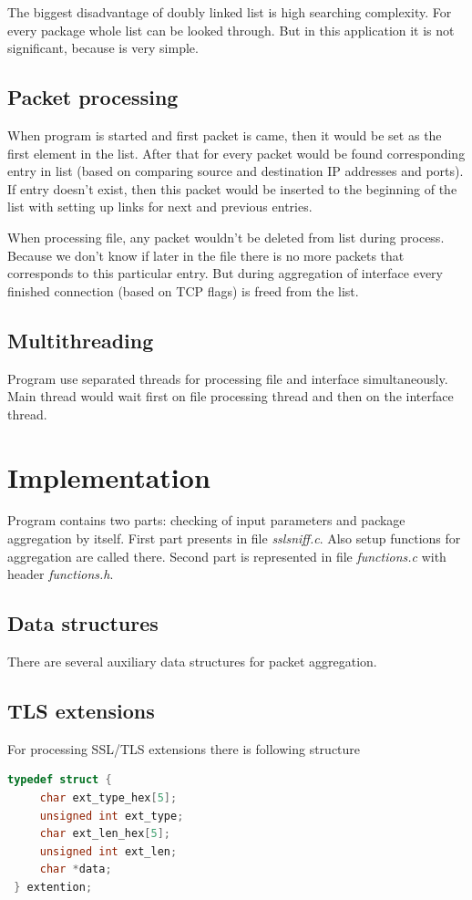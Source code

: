 \documentclass[12pt,a4paper]{article}
\begin{document}
    The biggest disadvantage of doubly linked list is high searching complexity.
    For every package whole list can be looked through. But in this application 
    it is not significant, because is very simple. 

    \subsection{Packet processing}

    When program is started and first packet is came, then it would be set as 
    the first element in the list. After that for every packet would be found 
    corresponding entry in list (based on comparing source and destination 
    IP addresses and ports). If entry doesn't exist, then this packet would be
    inserted to the beginning of the list with setting up links for next 
    and previous entries.
    
    When processing file, any packet wouldn't be deleted from list during 
    process. Because we don't know if later in the file there is no more 
    packets that corresponds to this particular entry. But during aggregation 
    of interface every finished connection (based on TCP flags) is freed from 
    the list.


    \subsection{Multithreading}
    Program use separated threads for processing file and interface 
    simultaneously. Main thread would wait first on file processing thread 
    and then on the interface thread.

    
    \section{Implementation}
    Program contains two parts: checking of input parameters and package aggregation by itself.
    First part presents in file \textit{sslsniff.c}. Also setup functions for aggregation are 
    called there. Second part is represented in file \textit{functions.c} with header 
    \textit{functions.h}. 

    \subsection{Data structures}
    There are several auxiliary data structures for packet aggregation. 

    \subsection{TLS extensions}
    For processing SSL/TLS extensions there is following structure
    \lstset{style=mystyle}
    \begin{lstlisting}[language=C]
 typedef struct {
     char ext_type_hex[5];
     unsigned int ext_type;
     char ext_len_hex[5];
     unsigned int ext_len;
     char *data;
 } extention;
    \end{lstlisting}
    
\end{document}
